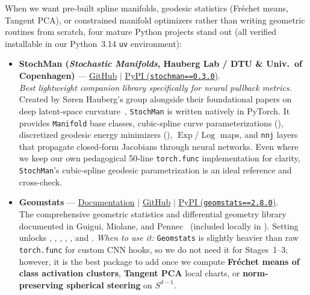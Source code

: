 \documentclass[11pt,a4paper]{article}
\DeclareMathOperator{\Exp}{Exp}
\DeclareMathOperator{\Log}{Log}
\theoremstyle{definition}
\begin{document}
When we want pre-built spline manifolds, geodesic statistics (Fr\'echet means, Tangent PCA), or constrained manifold optimizers rather than writing geometric routines from scratch, four mature Python projects stand out (all verified installable in our Python~3.14 \texttt{uv} environment):

\begin{itemize}[leftmargin=*]
    \item \textbf{StochMan (\emph{Stochastic Manifolds}, Hauberg Lab / DTU \& Univ.\ of Copenhagen)} ---
    \href{https://github.com/MachineLearningLifeScience/stochman}{GitHub} $\mid$ \href{https://pypi.org/project/stochman/}{PyPI (\texttt{stochman==0.3.0})}.\\
    \emph{Best lightweight companion library specifically for neural pullback metrics.} Created by S\o{}ren Hauberg's group alongside their foundational papers on deep latent-space curvature~\cite{arvanitidis2018oddity,hauberg2019onlybayes}, \texttt{StochMan} is written natively in PyTorch. It provides \texttt{Manifold} base classes, cubic-spline curve parameterizations (), discretized geodesic energy minimizers (), $\Exp$/$\Log$ maps, and \texttt{nnj} layers that propagate closed-form Jacobians through neural networks. Even where we keep our own pedagogical 50-line \texttt{torch.func} implementation for clarity, \texttt{StochMan}'s cubic-spline geodesic parametrization is an ideal reference and cross-check.

    \item \textbf{Geomstats} ---
    \href{https://geomstats.github.io}{Documentation} $\mid$ \href{https://github.com/geomstats/geomstats}{GitHub} $\mid$ \href{https://pypi.org/project/geomstats/}{PyPI (\texttt{geomstats==2.8.0})}.\\
    The comprehensive geometric statistics and differential geometry library documented in Guigui, Miolane, and Pennec~\cite{guigui2023geomstats,miolane2020geomstats} (included locally in ). Setting  unlocks , , , , , and . \emph{When to use it:} \texttt{Geomstats} is slightly heavier than raw \texttt{torch.func} for custom CNN hooks, so we do not need it for Stages~1--3; however, it is the best package to add once we compute \textbf{Fr\'echet means of class activation clusters}, \textbf{Tangent PCA} local charts, or \textbf{norm-preserving spherical steering} on $S^{d-1}$.


\end{itemize}
\end{document}
